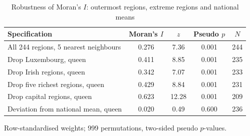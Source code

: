 \begin{table}[t]
\centering
\begin{threeparttable}
\caption{Robustness of Moran's $I$: outermost regions, extreme regions and national means}
\label{tab:robust}
\begin{tabular}{lcccc}
\toprule
Specification & Moran's $I$ & $z$ & Pseudo $p$ & $N$ \\
\midrule
All 244 regions, 5 nearest neighbours & 0.276 & 7.36 & 0.001 & 244 \\
Drop Luxembourg, queen & 0.411 & 8.85 & 0.001 & 235 \\
Drop Irish regions, queen & 0.342 & 7.07 & 0.001 & 233 \\
Drop five richest regions, queen & 0.429 & 8.84 & 0.001 & 231 \\
Drop capital regions, queen & 0.623 & 12.28 & 0.001 & 209 \\
Deviation from national mean, queen & 0.020 & 0.49 & 0.600 & 236 \\
\bottomrule
\end{tabular}
\begin{tablenotes}[flushleft]
\footnotesize
\item Row-standardised weights; 999 permutations, two-sided pseudo $p$-values.
\end{tablenotes}
\end{threeparttable}
\end{table}

